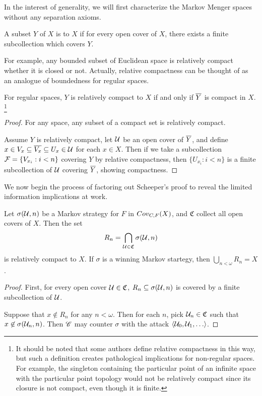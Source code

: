 In the interest of generality, we will first characterize the Markov Menger
spaces without any separation axioms.

\begin{defn}
  A subset $Y$ of $X$ is  to $X$ if for every open
  cover of $X$, there exists a finite subcollection which covers $Y$.
\end{defn}

For example, any bounded subset of Euclidean space is relatively compact
whether it is closed or not. Actually, relative compactness can be thought
of as an analogue of boundedness for regular spaces.

\begin{prop}
  For regular spaces, $Y$ is relatively compact to $X$ if and only if
  $\overline{Y}$ is compact in $X$.
  \footnote{
    It should be noted that some authors define relative compactness in
    this way, but such a definition creates pathological implications for
    non-regular spaces. For example, the singleton containing
    the particular point of an infinite space with the particular point topology
    would not be relatively compact since its closure is not compact, even
    though it is finite.
  }
\end{prop}

\begin{proof}
  For any space, any subset of a compact set is relatively compact.

  Assume $Y$ is relatively compact, let $\mathcal{U}$ be an open cover of $\overline{Y}$,
  and define $x\in V_x\subseteq \overline{V_x}\subseteq U_x \in \mathcal{U}$ for each
  $x\in X$. Then if we take a subcollection $\mathcal{F} = \{V_{x_i} : i<n\}$ covering
  $Y$ by relative compactness, then $\{U_{x_i}:i<n\}$ is a finite subcollection
  of $\mathcal{U}$ covering $\overline{Y}$, showing compactness.
\end{proof}

We now begin the process of factoring out Scheeper's proof to reveal the
limited information implications at work.

\begin{lem}
  Let $\sigma(\mathcal{U}, n)$ be a Markov strategy for $F$ in
  $Cov_{C,F}(X)$, and $\mathfrak{C}$ collect all open covers of $X$. Then the
  set
    \[
      R_n = \bigcap_{\mathcal{U}\in\mathfrak{C}} \sigma(\mathcal{U},n)
    \]
  is relatively compact to $X$. If $\sigma$ is a winning
  Markov startegy, then $\bigcup_{n<\omega} R_n = X$.
\end{lem}

\begin{proof}
  First, for every open cover $\mathcal{U}\in\mathfrak C$,
  $R_n\subseteq\sigma(\mathcal{U},n)$ is covered by a finite subcollection of $\mathcal{U}$.

  Suppose that $x \not\in R_n$ for any $n<\omega$. Then for each $n$,
  pick $\mathcal{U}_n\in\mathfrak{C}$ such that $x\not\in \sigma(\mathcal{U}_n,n)$. Then
  $\mathscr{C}$ may counter $\sigma$ with the attack $\<\mc U_0,\mc U_1,\dots\>$.
\end{proof}

